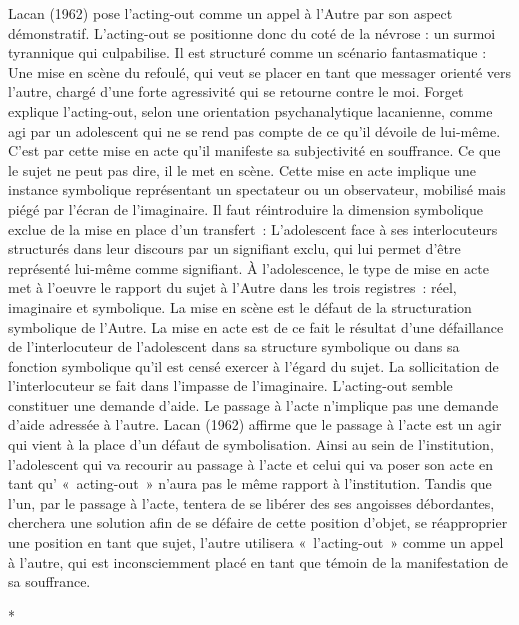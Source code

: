 \documentclass[12pt, a4paper]{book}
\begin{document}
\begin{spacing}{1.5}
Lacan (1962) pose l'acting-out comme un appel à l'Autre par son aspect démonstratif. L'acting-out se positionne donc du coté de la névrose : un surmoi tyrannique qui culpabilise. Il est structuré comme un scénario fantasmatique : Une mise en scène du refoulé, qui veut se placer en tant que messager orienté vers l'autre, chargé d'une forte agressivité qui se retourne contre le moi. Forget explique l'acting-out, selon une orientation psychanalytique lacanienne, comme agi  par  un adolescent qui ne se rend pas compte de ce qu'il dévoile de lui-même. C'est par cette mise en acte qu'il manifeste sa subjectivité en souffrance. Ce que le sujet ne peut pas dire, il le met en scène. Cette mise en acte implique une instance symbolique représentant un spectateur ou un observateur, mobilisé mais piégé par l'écran de l'imaginaire. Il faut réintroduire la dimension symbolique exclue de la mise en place d'un transfert : L'adolescent face à ses interlocuteurs structurés dans leur discours par un signifiant exclu, qui lui permet d'être représenté lui-même comme signifiant. À l'adolescence, le type de mise en acte met à l'oeuvre le rapport du sujet à l'Autre dans les trois registres : réel, imaginaire et symbolique. La mise en scène est le défaut de la structuration symbolique de l'Autre. La mise en acte est de ce fait le résultat d'une défaillance de l'interlocuteur de l'adolescent dans sa structure symbolique ou dans sa fonction symbolique qu'il est censé exercer à l'égard du sujet. La sollicitation de l'interlocuteur se fait dans l'impasse de l'imaginaire. L'acting-out semble constituer une demande d'aide. Le passage à l'acte n'implique pas une demande d'aide adressée à l'autre. Lacan (1962) affirme que le passage à l'acte est un agir qui vient à la place d'un défaut de symbolisation. Ainsi au sein de l'institution, l'adolescent qui va recourir au passage à l'acte et celui qui va poser son acte en tant qu' « acting-out » n'aura pas le même rapport à l'institution. Tandis que l'un, par le passage à l'acte, tentera de se libérer des ses angoisses débordantes, cherchera une solution afin de se défaire de cette position d'objet, se réapproprier une position en tant que sujet, l'autre utilisera « l'acting-out » comme un appel à l'autre, qui est inconsciemment placé en tant que témoin de la manifestation de sa souffrance.

\vspace{1cm}
\centerline{*}
\vspace{1cm}


\end{spacing}
\end{document}
